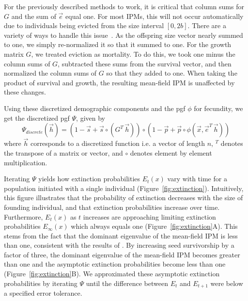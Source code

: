 \documentclass[12pt]{amsart}\usepackage[]{graphicx}\usepackage[]{color}
\begin{document}
For the previously described methods to work, it is critical that column sums for $G$ and the sum of $\vec e$ equal one. For most IPMs, this will not occur automatically due to individuals being evicted from the size interval $[0, 2b]$. There are a variety of ways to handle this issue~\citep{williams-etal-12}. As the offspring size vector nearly summed to one,  we simply re-normalized it so that it summed to one. For the growth matrix $G$, we treated eviction as mortality. To do this, we took one minus the column sums of $G$, subtracted these sums from the survival vector, and then normalized the column sums of $G$ so that they added to one. When taking the product of survival and growth, the resulting mean-field IPM is unaffected by these changes.

Using these discretized demographic components and the pgf $\phi$ for fecundity, we get the discretized pgf $\Psi$, given by
\[
\Psi_{discrete}(\vec h)=(1-\vec s+\vec s\circ (G^T\, \vec h))\circ(1-\vec p+\vec p\circ \phi(\vec x, \vec e^T\, \vec h))
\]
where $\vec h$ corresponds to a discretized function i.e. a vector of length $n$, $^T$ denotes the transpose of a matrix or vector,  and $\circ$ denotes element by element multiplication.





Iterating $\Psi$ yields how extinction probabilities $E_t(x)$ vary with time for a population initiated with a single individual (Figure~\ref{fig:extinction}). Intuitively, this figure illustrates that the probability of extinction decreases with the size of founding individual, and that extinction probabilities increase over time. Furthermore, $E_t(x)$ as $t$ increases are approaching limiting extinction probabilities $E_{\infty}(x)$ which always equals one (Figure~\ref{fig:extinction}A). This stems from the fact that the dominant eigenvalue of the mean-field IPM is less than one, consistent with the results of \citet{salguero-etal-12}. By increasing seed survivorship by a factor of three, the dominant eigenvalue of the mean-field IPM becomes greater than one and the asymptotic extinction probabilities become less than one (Figure~\ref{fig:extinction}B). We approximated these asymptotic extinction probabilities  by iterating $\Psi$ until the difference between $E_t$ and $E_{t+1}$ were below a specified error tolerance.
\end{document}
